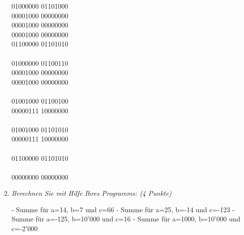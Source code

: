 \documentclass[10pt]{article}
\begin{document}
\begin{enumerate}[label=\alph*)]
			01000000 01101000 \\
			00001000 00000000 \\
			00001000 00000000 \\
			00001000 00000000 \\
			01100000 01101010 \\
			\\
			01000000 01100110 \\
			00001000 00000000 \\
			00001000 00000000 \\
			\\
			01001000 01100100 \\
			00000111 10000000 \\
			\\
			01001000 01101010 \\
			00000111 10000000 \\
			\\
			01100000 01101010 \\
			\\
			00000000 00000000
			
	\item
			\textit{Berechnen Sie mit Hilfe Ihres Programms: (4 Punkte)}
			
			- Summe für a=14, b=7 und c=66
			- Summe für a=25, b=-14 und c=-123
			- Summe für a=-125, b=10’000 und c=16
			- Summe für a=1000, b=10’000 und c=-2’000
			
\end{enumerate}
\end{document}
